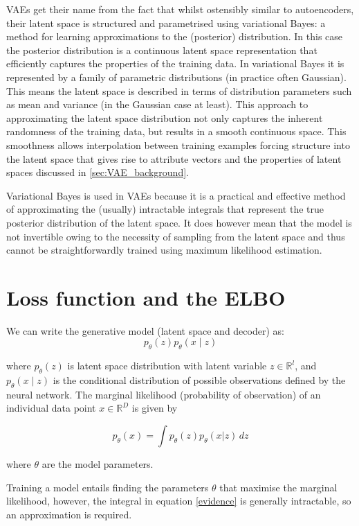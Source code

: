 \documentclass{mldsmsc}
\begin{document}
VAEs get their name from the fact that whilst ostensibly similar to autoencoders, their latent space is structured and parametrised using variational Bayes: a method for learning approximations to the (posterior) distribution. In this case the posterior distribution is a continuous latent space representation that efficiently captures the properties of the training data. In variational Bayes it is represented by a family of parametric distributions (in practice often Gaussian). This means the latent space is described in terms of distribution parameters such as mean and variance (in the Gaussian case at least). This approach to approximating the latent space distribution not only captures the inherent randomness of the training data, but results in a smooth continuous space. This smoothness allows interpolation between training examples forcing structure into the latent space that gives rise to attribute vectors and the properties of latent spaces discussed in \ref{sec:VAE_background}.

Variational Bayes is used in VAEs because it is a practical and effective method of approximating the (usually) intractable integrals that represent the true posterior distribution of the latent space. It does however mean that the model is not invertible owing to the necessity of sampling from the latent space and thus cannot be straightforwardly trained using maximum likelihood estimation. 

\section{Loss function and the ELBO}
We can write the generative model (latent space and decoder)  as: 
$$p_\theta({z})p_\theta({x} \mid {z})$$ 

where $p_\theta({z})$ is latent space distribution with latent variable $z \in \mathbb{R}^l$, and $p_\theta({x} \mid {z})$ is the conditional distribution of possible observations defined by the neural network. The marginal likelihood (probability of observation) of an individual data point $x\in\mathbb{R}^D$ is given by

\begin{equation}
	p_\theta(x) = \int p_\theta(z)p_\theta(x | z) \, dz
	\label{evidence}
\end{equation}

where $\theta$ are the model parameters. 

Training a model entails finding the parameters $\theta$ that maximise the marginal likelihood, however, the integral in equation \ref{evidence} is generally intractable, so an approximation is required.
\end{document}
